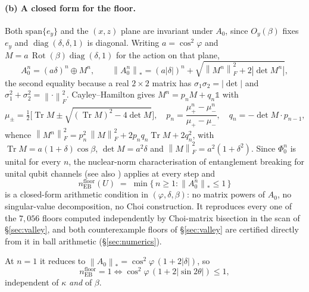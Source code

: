 \documentclass[11pt,a4paper]{article}
\theoremstyle{definition}
\theoremstyle{remark}
\DeclareMathOperator{\Tr}{Tr}
\DeclareMathOperator{\diag}{diag}
\DeclareMathOperator{\Rot}{Rot}
\newcommand{\I}{\mathbb{1}}
\newcommand{\floor}{n_{\mathrm{EB}}^{\mathrm{floor}}}
\newcommand{\nuc}[1]{\left\lVert #1 \right\rVert_{*}}
\newcommand{\Frob}[1]{\left\lVert #1 \right\rVert_{F}}
\begin{document}
\paragraph{(b) A closed form for the floor.} Both $\mathrm{span}\{e_y\}$ and the $(x,z)$ plane are invariant under $A_0$, since $O_y(\beta)$ fixes $e_y$ and $\diag(\delta,\delta,1)$ is diagonal. Writing $a = \cos^2\varphi$ and $M = a\,\Rot(\beta)\diag(\delta,1)$ for the action on that plane,
\begin{equation}\label{eq:nucAn}
  A_0^n = (a\delta)^n \oplus M^n, \qquad
  \nuc{A_0^n} = (a|\delta|)^n + \sqrt{\Frob{M^n}^2 + 2|\det M^n|},
\end{equation}
the second equality because a real $2\times2$ matrix has $\sigma_1\sigma_2 = |\det|$ and $\sigma_1^2+\sigma_2^2 = \Frob{\cdot}^2$. Cayley--Hamilton gives $M^n = p_nM + q_n\I$ with
\[
  \mu_\pm = \tfrac12\Big[\Tr M \pm \sqrt{(\Tr M)^2 - 4\det M}\Big],\quad
  p_n = \frac{\mu_+^n-\mu_-^n}{\mu_+-\mu_-},\quad q_n = -\det M\cdot p_{n-1},
\]
whence $\Frob{M^n}^2 = p_n^2\,\Frob{M}^2 + 2p_nq_n\Tr M + 2q_n^2$, with $\Tr M = a(1+\delta)\cos\beta$, $\det M = a^2\delta$ and $\Frob{M}^2 = a^2(1+\delta^2)$. Since $\Phi_0^n$ is unital for every $n$, the nuclear-norm characterisation of entanglement breaking for unital qubit channels \cite{Ruskai2003} (see also \cite{EBnorm}) applies at every step and
\begin{equation}\label{eq:floorclosed}
  \floor(U) \;=\; \min\{\,n\ge1 : \nuc{A_0^n}\le 1\,\}
\end{equation}
is a closed-form arithmetic condition in $(\varphi,\delta,\beta)$: no matrix powers of $A_0$, no singular-value decomposition, no Choi construction. It reproduces every one of the $7{,}056$ floors computed independently by Choi-matrix bisection in the scan of \S\ref{sec:valley}, and both counterexample floors of \S\ref{sec:valley} are certified directly from it in ball arithmetic (\S\ref{sec:numerics}).

At $n=1$ it reduces to $\nuc{A_0} = \cos^2\!\varphi\,(1+2|\delta|)$, so
\begin{equation}\label{eq:floorone}
  \floor = 1 \iff \cos^2\!\varphi\,(1+2|\sin2\theta|)\le1,
\end{equation}
independent of $\kappa$ \emph{and} of $\beta$.
\end{document}
